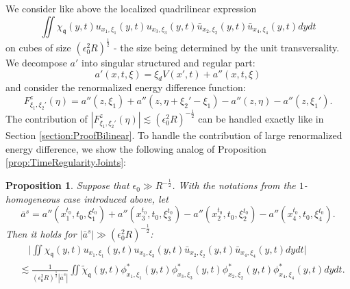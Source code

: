 \documentclass{amsart}
\newtheorem{proposition}[theorem]{Proposition}
\theoremstyle{definition}
\begin{document}
We consider like above the localized quadrilinear expression
\begin{equation*}
 \iint \chi_\mathfrak{q}(y,t) u_{x_1,\xi_1}(y,t) u_{x_3,\xi_3}(y,t) \bar{u}_{x_2,\xi_2}(y,t) \bar{u}_{x_4,\xi_4}(y,t) dy dt 
\end{equation*}
on cubes of size $(\epsilon_0^2 R)^{\frac{1}{2}}$ - the size being determined by the unit transversality. We decompose $a'$ into singular structured and regular part:
\begin{equation*}
a'(x,t,\xi) = \xi_d V(x',t) + a''(x,t,\xi)
\end{equation*}
and consider the renormalized energy difference function:
\begin{equation*}
F^z_{\xi_1,\xi_2'}(\eta) = a''(z,\xi_1) + a''(z,\eta + \xi_2'-\xi_1) - a''(z,\eta) - a''(z,\xi_1').
\end{equation*}
The contribution of $|F^z_{\xi_1,\xi_2'}(\eta)| \lesssim (\epsilon_0^2 R)^{-\frac{1}{2}}$ can be handled exactly like in Section \ref{section:ProofBilinear}. To handle the contribution of large renormalized energy difference, we show the following analog of Proposition \ref{prop:TimeRegularityJoints}:
\begin{proposition}
Suppose that $\epsilon_0 \gg R^{-\frac{1}{2}}$. With the notations from the $1$-homogeneous case introduced above, let
\begin{equation*}
\bar{a}^s = a''(x_1^{t_0},t_0,\xi_1^{t_0}) + a''(x_3^{t_0},t_0,\xi_3^{t_0}) - a''(x_2^{t_0},t_0,\xi_2^{t_0}) - a''(x_4^{t_0},t_0,\xi_4^{t_0}).
\end{equation*}
Then it holds for $|\bar{a}^s| \gg (\epsilon_0^2 R)^{-\frac{1}{2}}$:
\begin{equation*}
\begin{split}
&\quad \big| \iint \chi_{\mathfrak{q}}(y,t) u_{x_1,\xi_1}(y,t) u_{x_3,\xi_3}(y,t) \bar{u}_{x_2,\xi_2}(y,t) \bar{u}_{x_4,\xi_4}(y,t) dy dt \big| \\
 &\lesssim \frac{1}{(\epsilon_0^2 R)^{\frac{1}{2}} |\bar{a}^s|} \iint \tilde{\chi}_{\mathfrak{q}}(y,t) \phi^*_{x_1,\xi_1}(y,t) \phi^*_{x_3,\xi_3}(y,t) \phi^*_{x_2,\xi_2}(y,t) \phi^*_{x_4,\xi_4}(y,t) dy dt.
 \end{split}
\end{equation*}
\end{proposition}
\end{document}
